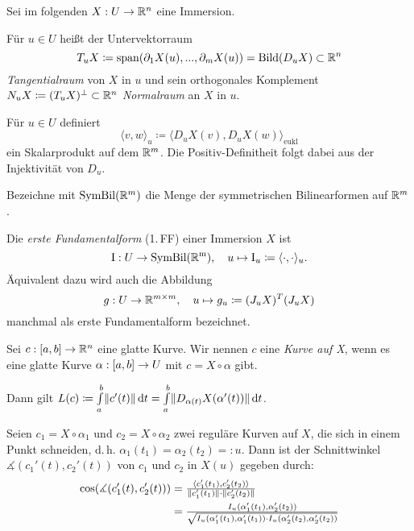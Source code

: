 \documentclass{cheat-sheet}
\newcommand{\Intabdt}[1]{\Int{a}{b}{#1}{t}}
\newcommand{\I}{\mathrm{I}}
\newcommand{\Span}{\mathrm{span}}
\begin{document}
\begin{nota}
  Sei im folgenden $X : U \to \mathbb{R}^n$ eine Immersion.
\end{nota}

\begin{defn}
  Für $u \in U$ heißt der Untervektorraum
  \[ T_u X \coloneqq \Span(\partial_1 X(u), ..., \partial_m X(u)) = \mathrm{Bild}(D_u X) \subset \R^n \]
  \emph{Tangentialraum} von $X$ in $u$ und sein orthogonales Komplement $N_u X \coloneqq (T_u X)^\perp \subset \mathbb{R}^n$ \emph{Normalraum} an $X$ in $u$.
\end{defn}

\begin{bem}
  Für $u \in U$ definiert
  \[ \langle v, w \rangle_u \coloneqq \langle D_u X(v), D_u X(w) \rangle_{\mathrm{eukl}} \]
  ein Skalarprodukt auf dem $\mathbb{R}^m$. Die Positiv-Definitheit folgt dabei aus der Injektivität von $D_u$.
\end{bem}

\begin{nota}
  Bezeichne mit $\mathrm{SymBil}(\mathbb{R}^m)$ die Menge der symmetrischen Bilinearformen auf $\mathbb{R}^m$.
\end{nota}

\begin{defn}
  Die \emph{erste Fundamentalform} (1.\,FF) einer Immersion $X$ ist
  \[ \I : U \to \mathrm{SymBil(\R^m)}, \quad u \mapsto \I_u \coloneqq \langle \cdot , \cdot \rangle_u. \]
  Äquivalent dazu wird auch die Abbildung
  \[ g : U \to \mathbb{R}^{m \times m}, \quad u \mapsto g_u \coloneqq (J_u X)^T (J_u X) \]
  manchmal als erste Fundamentalform bezeichnet.
\end{defn}

\begin{defn}
  Sei $c : \left[ a, b \right] \to \mathbb{R}^n$ eine glatte Kurve. Wir nennen $c$ eine \emph{Kurve auf X}, wenn es eine glatte Kurve $\alpha : \left[ a, b \right] \to U$ mit $c = X \circ \alpha$ gibt.
\end{defn}

\begin{bem}
  Dann gilt $L(c) \coloneqq \Intabdt{\norm{c'(t)}} = \Intabdt{\norm{D_{\alpha(t)} X(\alpha'(t))}}$.
\end{bem}

\begin{bem}
  Seien $c_1 = X \circ \alpha_1$ und $c_2 = X \circ \alpha_2$ zwei reguläre Kurven auf $X$, die sich in einem Punkt schneiden, d.\,h. $\alpha_1(t_1) = \alpha_2(t_2) =: u$. Dann ist der Schnittwinkel $\measuredangle(c_1'(t), c_2'(t))$ von $c_1$ und $c_2$ in $X(u)$ gegeben durch:
  \begin{align*}
    \cos(\measuredangle(c_1'(t), c_2'(t))) &= \tfrac{\langle c_1'(t_1) , c_2'(t_2) \rangle}{\lVert c_1'(t_1)\rVert \cdot \lVert c_2'(t_2)\rVert} \\
    &= \tfrac{I_u(\alpha_1'(t_1), \alpha_2'(t_2))}{\sqrt{I_u(\alpha_1'(t_1), \alpha_1'(t_1)) \cdot I_u(\alpha_2'(t_2), \alpha_2'(t_2))}}
  \end{align*}
\end{bem}
\end{document}
